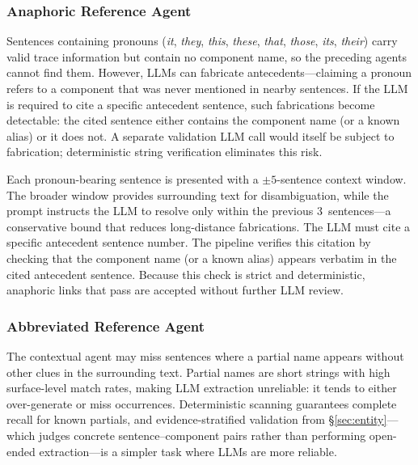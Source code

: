 \subsubsection{Anaphoric Reference Agent}\label{sec:coref}

Sentences containing pronouns (\emph{it}, \emph{they}, \emph{this},
\emph{these}, \emph{that}, \emph{those}, \emph{its}, \emph{their})
carry valid trace information but contain no component name, so
the preceding agents cannot find them.
However, LLMs can fabricate antecedents---claiming a pronoun refers
to a component that was never mentioned in nearby sentences.
If the LLM is required to cite a specific antecedent sentence,
such fabrications become detectable: the cited sentence either
contains the component name (or a known alias) or it does not.
A separate validation LLM call would itself be subject to
fabrication; deterministic string verification eliminates this risk.

Each pronoun-bearing sentence is presented with a $\pm5$-sentence
context window.
The broader window provides surrounding text for disambiguation,
while the prompt instructs the LLM to resolve only within the
previous 3~sentences---a conservative bound that reduces
long-distance fabrications.
The LLM must cite a specific antecedent sentence number.
The pipeline verifies this citation by checking that the
component name (or a known alias) appears verbatim in the
cited antecedent sentence.
Because this check is strict and deterministic, anaphoric
links that pass are accepted without further LLM review.

\subsubsection{Abbreviated Reference Agent}\label{sec:partial}

The contextual agent may miss sentences where a partial name
appears without other clues in the surrounding text.
Partial names are short strings with high surface-level match rates,
making LLM extraction unreliable: it tends to either over-generate
or miss occurrences.
Deterministic scanning guarantees complete recall for known
partials, and evidence-stratified validation from
\S\ref{sec:entity}---which judges concrete sentence--component
pairs rather than performing open-ended extraction---is a simpler
task where LLMs are more reliable.


